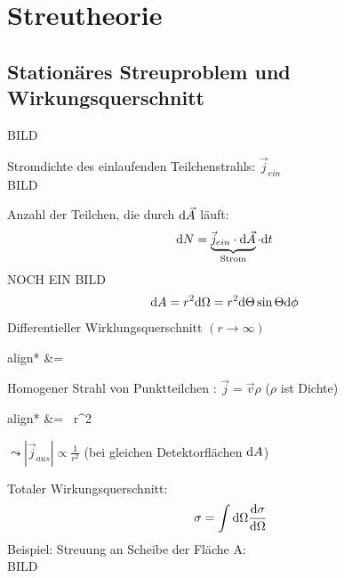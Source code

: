\section{Streutheorie}
	\subsection{Stationäres Streuproblem und Wirkungsquerschnitt}
	BILD
		
	Stromdichte des einlaufenden Teilchenstrahls: $\vec{j}_{ein}$
	\\
	BILD
	
	Anzahl der Teilchen, die durch $\mathrm{d} \vec{A}$ läuft:
		\begin{align*}
			\diff N &= 
			\underbrace{\vec{j}_{ein} \cdot \diff \vec{A}}_{\mathclap{\text{Strom}}}
			\cdot \diff t
		\end{align*}
	NOCH EIN BILD
		\begin{align*}
			\mathrm{d} A &= r^2 \mathrm{d} \Omega = r^2 \mathrm{d} \Theta \sin \Theta \mathrm{d} \phi
		\end{align*}
	Differentieller Wirklungsquerschnitt $(r \rightarrow \infty)$
		\begin{empheq}[box=\boxed]{align*}
			\frac{\diff \sigma}{\diff \Omega} &=
			 
		\end{empheq}
	Homogener Strahl von Punktteilchen : $\vec{j} = \vec{v} \rho$ ($\rho$ ist Dichte)
		\begin{empheq}[box=\boxed]{align*}
			\frac{\diff \sigma}{\diff \Omega} &=
			 ~r^2
		\end{empheq}
	$ \leadsto |\vec{j}_{aus}| \propto \frac{1}{r^2}$ (bei gleichen Detektorflächen $\mathrm{d} A$)
	
	Totaler Wirkungsquerschnitt:
		\begin{align*}
			\sigma = \int \mathrm{d} \Omega \frac{\mathrm{d} \sigma}{\mathrm{d} \Omega}
		\end{align*}
	Beispiel: Streuung an Scheibe der Fläche A:
	\\
	BILD
	\\
	